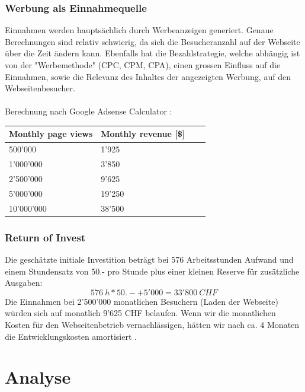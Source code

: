 \documentclass[11pt,ngerman]{article}
\begin{document}
    \subsubsection{Werbung als Einnahmequelle}
    Einnahmen werden hauptsächlich durch Werbeanzeigen generiert. Genaue Berechnungen sind relativ schwierig, da sich die Besucheranzahl auf der Webseite über die Zeit ändern kann. Ebenfalls hat die Bezahlstrategie, welche abhängig ist von der "Werbemethode" (CPC, CPM, CPA), einen grossen Einfluss auf die Einnahmen, sowie die Relevanz des Inhaltes der angezeigten Werbung, auf den Webseitenbesucher\cite{CPCVsCPA2019}\cite{daswani2008online}. \\
    \\
    Berechnung nach Google Adsense Calculator \cite{GoogleAdSenseEarn}:
    \begin{center}
        \begin{tabular}{ | l | l | l | p{5cm} |}
            \hline
            Monthly page views & Monthly revenue [\$]  \\ \hline
            500'000 & 1'925 \\ \hline
            1'000'000 & 3'850 \\ \hline
            2'500'000 & 9'625 \\ \hline
            5'000'000 & 19'250 \\ \hline
            10'000'000 & 38'500 \\ \hline
        \end{tabular}
    \end{center}

    \subsubsection{Return of Invest}
    Die geschätzte initiale Investition beträgt bei 576 Arbeitsstunden Aufwand und einem Stundensatz von 50.- pro Stunde plus einer kleinen Reserve für zusätzliche Ausgaben:
    \[576\ h * 50.- + 5'000 = 33'800\ CHF\]
    Die Einnahmen bei 2'500'000 monatlichen Besuchern (Laden der Webseite)  würden sich auf monatlich 9'625 CHF belaufen. Wenn wir die monatlichen Kosten für den Webseitenbetrieb vernachlässigen, hätten wir nach ca. 4 Monaten die Entwicklungskosten amortisiert    .\\

    \newpage

    \section{Analyse}
\end{document}
